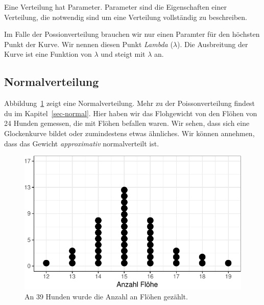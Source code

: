 \documentclass[
  letterpaper,
  DIV=11,
  oneside]{scrreport}
\begin{document}
{}

Eine Verteilung hat Parameter. Parameter sind die Eigenschaften einer
Verteilung, die notwendig sind um eine Verteilung vollständig zu
beschreiben.

Im Falle der Possionverteilung brauchen wir nur einen Paramter für den
höchsten Punkt der Kurve. Wir nennen diesen Punkt \emph{Lambda}
(\(\lambda\)). Die Ausbreitung der Kurve ist eine Funktion von
\(\lambda\) und steigt mit \(\lambda\) an.

\hypertarget{normalverteilung}{%
\subsection{Normalverteilung}\label{normalverteilung}}

Abbildung~\ref{fig-preface-normal-1} zeigt eine Normalverteilung. Mehr
zu der Poissonverteilung findest du im Kapitel~\ref{sec-normal}. Hier
haben wir das Flohgewicht von den Flöhen von 24 Hunden gemessen, die mit
Flöhen befallen waren. Wir sehen, dass sich eine Glockenkurve bildet
oder zumindestens etwas ähnliches. Wir können annehmen, dass das Gewicht
\emph{approximativ} normalverteilt ist.

{}

\begin{figure}

{\centering \includegraphics{./preface_files/figure-pdf/fig-preface-normal-1-1.pdf}

}

\caption{\label{fig-preface-normal-1}An 39 Hunden wurde die Anzahl an
Flöhen gezählt.}

\end{figure}
\end{document}
